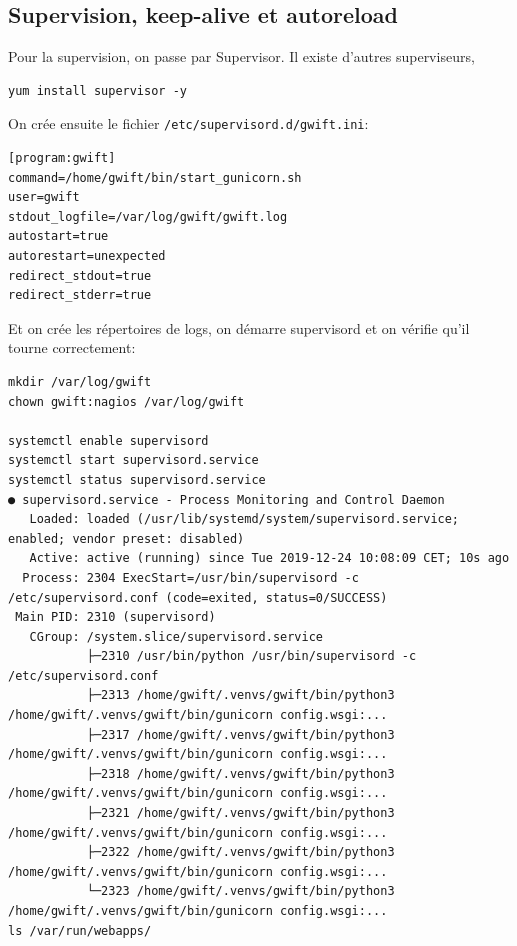 \documentclass[11pt]{amsbook}
\begin{document}
\hypertarget{x-supervision,-keep-alive-et-autoreload}{\subsection{Supervision, keep-alive et autoreload}}
Pour la supervision, on passe par Supervisor. Il existe d’autres superviseurs,


\begin{verbatim}
yum install supervisor -y
\end{verbatim}

On crée ensuite le fichier \texttt{/etc/supervisord.d/gwift.ini}:


\begin{verbatim}
[program:gwift]
command=/home/gwift/bin/start_gunicorn.sh
user=gwift
stdout_logfile=/var/log/gwift/gwift.log
autostart=true
autorestart=unexpected
redirect_stdout=true
redirect_stderr=true
\end{verbatim}

Et on crée les répertoires de logs, on démarre supervisord et on vérifie qu’il tourne correctement:


\begin{verbatim}
mkdir /var/log/gwift
chown gwift:nagios /var/log/gwift

systemctl enable supervisord
systemctl start supervisord.service
systemctl status supervisord.service
● supervisord.service - Process Monitoring and Control Daemon
   Loaded: loaded (/usr/lib/systemd/system/supervisord.service; enabled; vendor preset: disabled)
   Active: active (running) since Tue 2019-12-24 10:08:09 CET; 10s ago
  Process: 2304 ExecStart=/usr/bin/supervisord -c /etc/supervisord.conf (code=exited, status=0/SUCCESS)
 Main PID: 2310 (supervisord)
   CGroup: /system.slice/supervisord.service
           ├─2310 /usr/bin/python /usr/bin/supervisord -c /etc/supervisord.conf
           ├─2313 /home/gwift/.venvs/gwift/bin/python3 /home/gwift/.venvs/gwift/bin/gunicorn config.wsgi:...
           ├─2317 /home/gwift/.venvs/gwift/bin/python3 /home/gwift/.venvs/gwift/bin/gunicorn config.wsgi:...
           ├─2318 /home/gwift/.venvs/gwift/bin/python3 /home/gwift/.venvs/gwift/bin/gunicorn config.wsgi:...
           ├─2321 /home/gwift/.venvs/gwift/bin/python3 /home/gwift/.venvs/gwift/bin/gunicorn config.wsgi:...
           ├─2322 /home/gwift/.venvs/gwift/bin/python3 /home/gwift/.venvs/gwift/bin/gunicorn config.wsgi:...
           └─2323 /home/gwift/.venvs/gwift/bin/python3 /home/gwift/.venvs/gwift/bin/gunicorn config.wsgi:...
ls /var/run/webapps/
\end{verbatim}
\end{document}

